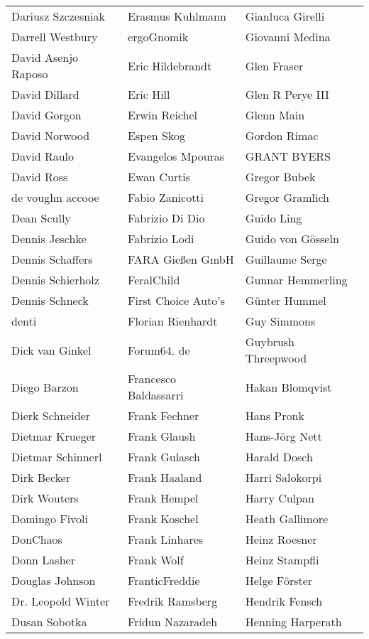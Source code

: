 \begin{tabular}{p{4.5cm}p{4.5cm}p{4.5cm}}
Dariusz Szczesniak & Erasmus Kuhlmann & Gianluca Girelli \\
Darrell Westbury & ergoGnomik & Giovanni Medina \\
David Asenjo Raposo & Eric Hildebrandt & Glen Fraser \\
David Dillard & Eric Hill & Glen R Perye III \\
David Gorgon & Erwin Reichel & Glenn Main \\
David Norwood & Espen Skog & Gordon Rimac \\
David Raulo & Evangelos Mpouras & GRANT BYERS \\
David Ross & Ewan Curtis & Gregor Bubek \\
de voughn accooe & Fabio Zanicotti & Gregor Gramlich \\
Dean Scully & Fabrizio Di Dio & Guido Ling \\
Dennis Jeschke & Fabrizio Lodi & Guido von Gösseln \\
Dennis Schaffers & FARA Gießen GmbH & Guillaume Serge \\
Dennis Schierholz & FeralChild & Gunnar Hemmerling \\
Dennis Schneck & First Choice Auto's & Günter Hummel \\
denti & Florian Rienhardt & Guy Simmons \\
Dick van Ginkel & Forum64. de & Guybrush Threepwood \\
Diego Barzon & Francesco Baldassarri & Hakan Blomqvist \\
Dierk Schneider & Frank Fechner & Hans Pronk \\
Dietmar Krueger & Frank Glaush & Hans-Jörg Nett \\
Dietmar Schinnerl & Frank Gulasch & Harald Dosch \\
Dirk Becker & Frank Haaland & Harri Salokorpi \\
Dirk Wouters & Frank Hempel & Harry Culpan \\
Domingo Fivoli & Frank Koschel & Heath Gallimore \\
DonChaos & Frank Linhares & Heinz Roesner \\
Donn Lasher & Frank Wolf & Heinz Stampfli \\
Douglas Johnson & FranticFreddie & Helge Förster \\
Dr. Leopold Winter & Fredrik Ramsberg & Hendrik Fensch \\
Dusan Sobotka & Fridun Nazaradeh & Henning Harperath \\

\end{tabular}
